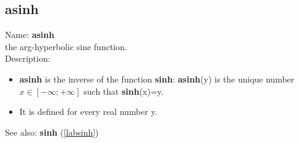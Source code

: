 \subsection{asinh}
\label{labasinh}
\noindent Name: \textbf{asinh}\\
the arg-hyperbolic sine function.\\
\noindent Description: \begin{itemize}

\item \textbf{asinh} is the inverse of the function \textbf{sinh}: \textbf{asinh}(y) is the unique number 
   $x \in [-\infty; +\infty]$ such that \textbf{sinh}(x)=y.

\item It is defined for every real number y.
\end{itemize}
See also: \textbf{sinh} (\ref{labsinh})
